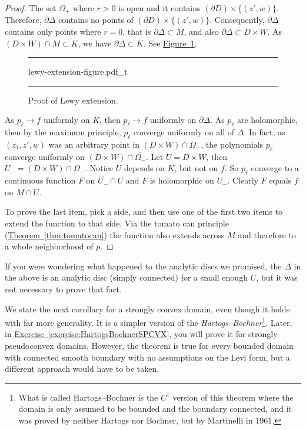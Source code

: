 \documentclass[12pt,openany]{book}
\newcommand{\myindex}[1]{#1\index{#1}}
\theoremstyle{plain}
\theoremstyle{remark}
\theoremstyle{definition}
\newenvironment{myfig}{%
\begin{figure}[h!t]
\noindent\rule{\textwidth}{0.5pt}\vspace{12pt}\par\centering}%
{\par\noindent\rule{\textwidth}{0.5pt}
\end{figure}}
\theoremstyle{exercise}
\theoremstyle{example}
\newcommand{\figureref}[1]{\hyperref[#1]{Figure~\ref*{#1}}}
\newcommand{\exerciseref}[1]{\hyperref[#1]{Exercise~\ref*{#1}}}
\newcommand{\thmref}[1]{\hyperref[#1]{Theorem~\ref*{#1}}}
\begin{document}
\begin{proof}
The set $\Omega_+$ where $r > 0$ is open and it contains
$(\partial D) \times \{ (z',w) \}$.  Therefore,
$\partial \Delta$ contains no points of $(\partial D) \times \{ (z',w) \}$.
Consequently, $\partial \Delta$ contains only points where
$r = 0$, that is $\partial \Delta \subset M$, and
also
$\partial \Delta \subset D \times W$.
As $(D \times W) \cap M \subset K$, we have $\partial \Delta \subset K$.
See \figureref{fig:lewy-extension-figure}.

\begin{myfig}
{lewy-extension-figure.pdf_t}
\caption{Proof of Lewy extension.\label{fig:lewy-extension-figure}}
\end{myfig}

As $p_\ell \to f$ uniformly on $K$, then $p_\ell \to f$ uniformly on
$\partial \Delta$.  As  $p_\ell$ are holomorphic, then by the maximum
principle, $p_\ell$ converge uniformly on all of $\Delta$.  In fact, as $(z_1,z',w)$ was
an arbitrary point in $(D \times W) \cap \Omega_-$,
the polynomials $p_\ell$ converge uniformly on
$(D \times W) \cap \overline{\Omega_-}$.
Let $U = D \times W$, then $U_- = (D \times W) \cap \Omega_-$.
Notice $U$ depends on $K$, but not on $f$.
So $p_\ell$ converge to a continuous function $F$ on $\overline{U_-} \cap
U$ and $F$ is holomorphic on $U_-$.  Clearly $F$ equals $f$ on $M \cap U$.

To prove the last item, pick a side, and then use one of the first two
items to extend the function to that side.  Via the tomato can
principle (\thmref{thm:tomatocan}) the function also extends across $M$ and
therefore to a whole neighborhood of $p$.
\end{proof}

If you were wondering what happened to the analytic discs we promised,
the $\Delta$ in the above is an analytic disc (simply connected) for a small enough $U$, but it was
not necessary to prove that fact.

We state the next corollary for a strongly convex domain, even though it
holds with far more generality.
It is a simpler version of the \emph{\myindex{Hartogs--Bochner}}\footnote{What is called
Hartogs--Bochner is
the $C^1$ version of this theorem where the domain is only assumed to be bounded
and the boundary connected,
and it was proved by neither Hartogs nor
Bochner, but by Martinelli in 1961.}.
Later, in \exerciseref{exercise:HartogsBochnerSPCVX},
you will prove it for strongly pseudoconvex
domains.  However, the theorem is true for every bounded domain with connected smooth
boundary
with no assumptions on the Levi form, but
a different approach would have to be taken.
\end{document}
